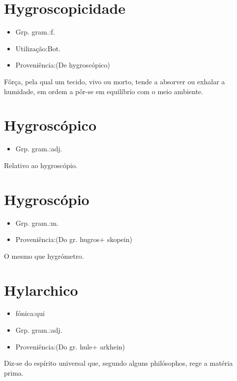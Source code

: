\documentclass{article}
\begin{document}
\section{Hygroscopicidade}
\begin{itemize}
\item {Grp. gram.:f.}
\end{itemize}
\begin{itemize}
\item {Utilização:Bot.}
\end{itemize}
\begin{itemize}
\item {Proveniência:(De \textunderscore hygroscópico\textunderscore )}
\end{itemize}
Fôrça, pela qual um tecido, vivo ou morto, tende a absorver ou exhalar a humidade, em ordem a pôr-se em equilíbrio com o meio ambiente.
\section{Hygroscópico}
\begin{itemize}
\item {Grp. gram.:adj.}
\end{itemize}
Relativo ao hygroscópio.
\section{Hygroscópio}
\begin{itemize}
\item {Grp. gram.:m.}
\end{itemize}
\begin{itemize}
\item {Proveniência:(Do gr. \textunderscore hugros\textunderscore  + \textunderscore skopein\textunderscore )}
\end{itemize}
O mesmo que \textunderscore hygrómetro\textunderscore .
\section{Hylarchico}
\begin{itemize}
\item {fónica:qui}
\end{itemize}
\begin{itemize}
\item {Grp. gram.:adj.}
\end{itemize}
\begin{itemize}
\item {Proveniência:(Do gr. \textunderscore hule\textunderscore  + \textunderscore arkhein\textunderscore )}
\end{itemize}
Diz-se do espírito universal que, segundo alguns philósophos, rege a matéria prima.
\end{document}
